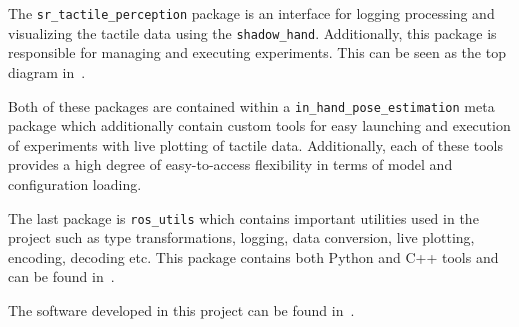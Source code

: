 The \texttt{sr\_tactile\_perception} package is an interface for logging processing and visualizing the tactile data using the \texttt{shadow\_hand}. Additionally, this package is responsible for managing and executing experiments. This can be seen as the top diagram in~. \medskip

Both of these packages are contained within a \texttt{in\_hand\_pose\_estimation} meta package which additionally contain custom tools for easy launching and execution of experiments with live plotting of tactile data. Additionally, each of these tools provides a high degree of easy-to-access flexibility in terms of model and configuration loading.

The last package is \texttt{ros\_utils} which contains important utilities used in the project such as type transformations, logging, data conversion, live plotting, encoding, decoding etc. This package contains both Python and C++ tools and can be found in~\cite{ros-utils-repo}.\medskip

The software developed in this project can be found in~\cite{in-hand-pose-estimation-repo}.




